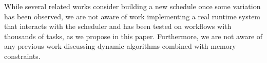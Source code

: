 \documentclass[conference]{IEEEtran}
\begin{document}
While several related works consider building a new schedule once some variation has been observed,
we are not aware of work implementing a real runtime system that interacts with the scheduler
and has been tested on workflows with thousands of tasks, as we propose in this paper. Furthermore, 
we are not aware of any previous work discussing dynamic algorithms combined with memory constraints. 

%
%
%
%
%
%
%
%
%
%
%
%
%
\end{document}
